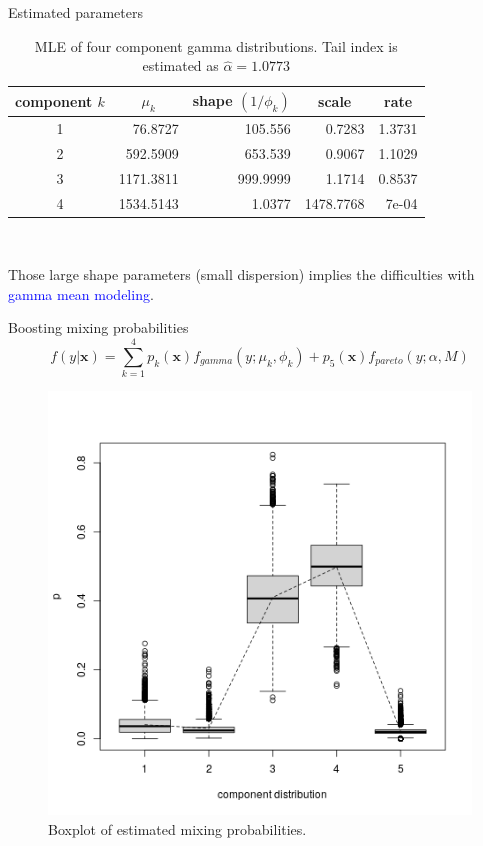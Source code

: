 \documentclass[11pt]{article}
\numberwithin{equation}{section}
\def\bx{\boldsymbol{x}}
\newcommand{\blue}[1]{\textcolor{blue}{#1}}
\begin{document}
\begin{frame}{Estimated parameters}	\begin{table}[h!]
		\centering
		\caption{MLE of four component gamma distributions. Tail index is estimated as $\hat{\alpha}=1.0773$}\label{null-gamma}
		\begin{tabular}{crrrr}
			\hline
			component $k$ & \multicolumn{1}{c}{$\mu_k$} & \multicolumn{1}{c}{shape $(1/\phi_k)$} & \multicolumn{1}{c}{scale} & \multicolumn{1}{c}{rate} \\ \hline
			1         & 76.8727                & 105.556                   & 0.7283                    & 1.3731                   \\
			2         & 592.5909               & 653.539                   & 0.9067                    & 1.1029                   \\
			3         & 1171.3811              & 999.9999                  & 1.1714                    & 0.8537                   \\
			4         & 1534.5143              & 1.0377                    & 1478.7768                 & 7e-04                    \\ \hline
		\end{tabular}
	\end{table}
	
	~
	
	Those large shape parameters (small dispersion) implies the difficulties with \blue{gamma mean modeling}.
\end{frame}

\begin{frame}{Boosting mixing probabilities}
	$$f(y|\bx)=\sum_{k=1}^4p_k(\bx)f_{gamma}(y;\mu_k,\phi_k)+p_5(\bx)f_{pareto}(y;\alpha,M)$$
	\begin{figure}[htp!]
		\centering
		\includegraphics[width=0.35\linewidth]{../plots/sev/glm_p}
		\caption{Boxplot of estimated mixing probabilities.}\label{glm-p}
	\end{figure}
\end{frame}
\end{document}
